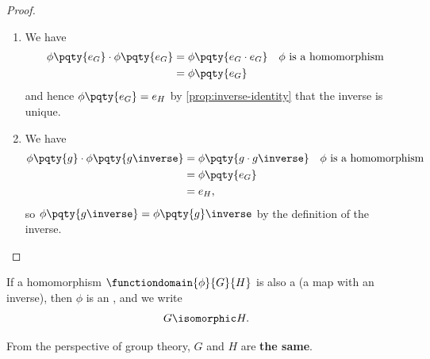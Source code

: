 \begin{proof}
    \begin{enumerate}
        \item We have
        \begin{align*}
            \phi\pqty{e_G} \cdot \phi\pqty{e_G} &= \phi\pqty{e_G \cdot e_G} && \phi \text{ is a homomorphism} \\
            &= \phi\pqty{e_G}
        \end{align*}
        and hence \(\phi\pqty{e_G} = e_H\) by \autoref{prop:inverse-identity} that the inverse is unique.

        \item We have
        \begin{align*}
            \phi\pqty{g} \cdot \phi\pqty{g \inverse} &= \phi\pqty{g \cdot g\inverse} && \phi \text{ is a homomorphism} \\
            &= \phi\pqty{e_G} \\
            &= e_H,
        \end{align*}
        so \(\phi\pqty{g \inverse} = \phi\pqty{g}\inverse\) by the definition of the inverse.
    \end{enumerate}
\end{proof}

\begin{definition}[Isomorphism]
    \label{def:isomorphism}%
    If a homomorphism \(\functiondomain{\phi}{G}{H}\) is also a  (a map with an inverse), then \(\phi\) is an , and we write
    \[
        G \isomorphic H. 
    \]
\end{definition}

From the perspective of group theory, \(G\) and \(H\) are \textbf{the same}.

